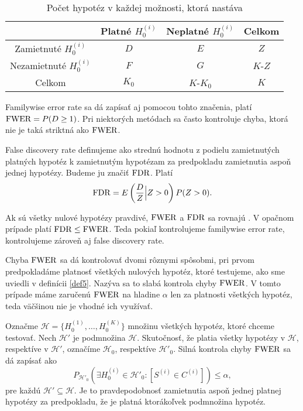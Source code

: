 \begin{table}[h!]
    \centering
    \begin{tabular}{|c|c|c|c|}
      \hline
       & Platné $H^{(i)}_0$ & Neplatné $H^{(i)}_0$ & Celkom \\ \hline
      Zamietnuté $H^{(i)}_0$ & $D$ & $E$ & $Z$ \\ \hline
      Nezamietnuté $H^{(i)}_0$ & $F$ & $G$ & $K$-$Z$ \\ \hline
      Celkom & $K_0$ & $K$-$K_0$ & $K$ \\ \hline
    \end{tabular}
    \caption{Počet hypotéz v každej možnosti, ktorá nastáva}
    \label{tab02:1}
\end{table}

Familywise error rate sa dá zapísať aj pomocou tohto značenia, platí 
${\rm FWER} = P (D \geq 1)$. 
Pri niektorých metódach sa často kontroluje chyba, ktorá nie je taká striktná ako ${\rm FWER}$. 

\begin{definicia}\label{def6}
  False discovery rate definujeme ako strednú hodnotu z podielu zamietnutých platných hypotéz k zamietnutým hypotézam  
  za predpokladu zamietnutia aspoň jednej hypotézy. Budeme ju značiť ${\rm FDR}$. 
  Platí 
  $$ {\rm FDR} = E \left( \frac{D}{Z} \Big| Z>0 \right) P(Z>0). $$
\end{definicia}

Ak sú všetky nulové hypotézy pravdivé, ${\rm FWER}$ a ${\rm FDR}$ sa rovnajú \cite{Benjamini&Hochberg95}. 
V opačnom prípade platí ${\rm FDR} \leq {\rm FWER}$. 
Teda pokiaľ kontrolujeme familywise error rate, kontrolujeme zároveň aj false discovery rate. 

Chyba ${\rm FWER}$ sa dá kontrolovať dvomi rôznymi spôsobmi, 
pri prvom predpokladáme platnosť všetkých nulových hypotéz, ktoré testujeme, 
ako sme uviedli v definícii \ref{def5}. 
Nazýva sa to slabá kontrola chyby ${\rm FWER}$. 
V tomto prípade máme zaručenú ${\rm FWER}$ na hladine $\alpha$ len za platnosti všetkých hypotéz, 
teda väčšinou nie je vhodné ich využívať. 

Označme $\mathcal{H} = \{ H_0^{(1)}, \dots, H_0^{(K)} \}$ množinu všetkých hypotéz, ktoré chceme testovať. 
Nech $\mathcal{H}'$ je podmnožina $\mathcal{H}$. 
Skutočnosť, že platia všetky hypotézy v $\mathcal{H}$, respektíve v $\mathcal{H}'$, 
označíme ${\mathcal{H}}_0$, respektíve ${\mathcal{H}}'_0$. 
Silná kontrola chyby ${\rm FWER}$ sa dá zapísať ako 
$$ P_{{\mathcal{H}}'_0} \left( \exists H_0^{(i)} \in {\mathcal{H}}'_0: [S^{(i)} \in C^{(i)}] \right) \leq \alpha, $$
pre každú $\mathcal{H}' \subseteq \mathcal{H}$. 
Je to pravdepodobnosť zamietnutia aspoň jednej platnej hypotézy za predpokladu, 
že je platná ktorákoľvek podmnožina hypotéz. 

